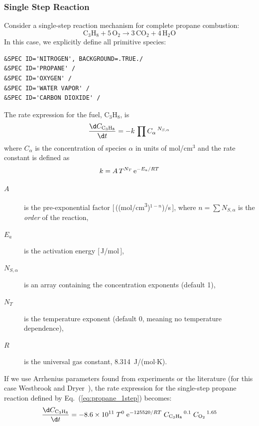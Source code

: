 \documentclass[11pt]{book}
\begin{document}
\subsubsection{Single Step Reaction}

Consider a single-step reaction mechanism for complete propane combustion:
\begin{equation}\label{eq:propane_1step}
\mathrm{C_3H_8 + 5\,O_{2} \rightarrow 3\,CO_{2} + 4\,H_{2}O}
\end{equation}
In this case, we explicitly define all primitive species:
\begin{lstlisting}
&SPEC ID='NITROGEN', BACKGROUND=.TRUE./
&SPEC ID='PROPANE' /
&SPEC ID='OXYGEN' /
&SPEC ID='WATER VAPOR' /
&SPEC ID='CARBON DIOXIDE' /
\end{lstlisting}
The rate expression for the fuel, $\mathrm{C_3H_8}$, is
\begin{equation}\label{eq:finite_rate}
\frac{\d C_{\mathrm{C_3H_8}}}{\d t}= -k \, \prod C_{\alpha}\,^{N_{S,\alpha}}
\end{equation}
where $C_\alpha$ is the concentration of species $\alpha$ in units of mol/cm$^3$ and the rate constant is defined as
\begin{equation}\label{eq:reac_rate}
k = A \, T^{N_{T}} \, {\rm e}^{-E_a/RT}
\end{equation}
\begin{description}
\item[$A$] is the pre-exponential factor [\,((\si{mol/cm^3})$^{1-n}$)/s\,], where $n=\sum N_{S,\alpha}$ is the \emph{order} of the reaction,
\item[$E_a$] is the activation energy [\,\si{J/mol}\,],
\item[$N_{S,\alpha}$] is an array containing the concentration exponents (default 1),
\item[$N_T$] is the temperature exponent (default 0, meaning no temperature dependence),
\item[$R$] is the universal gas constant, 8.314~J/(mol$\cdot$K).
\end{description}
If we use Arrhenius parameters found from experiments or the literature (for this case Westbrook and Dryer~\cite{Westbrook:1}), the rate expression for the single-step propane reaction defined by Eq.~(\ref{eq:propane_1step}) becomes:
\begin{equation}\label{eq:reac_rate2}
\frac{\d C_{\mathrm{C_3H_8}}}{\d t} = -8.6 \times 10^{11} \; T^{0} \; {\rm e}^{-125520/RT} \; C_{\mathrm{C_3H_8}}\,^{0.1} \; C_{\mathrm{O_2}}\,^{1.65}
\end{equation}
\end{document}
